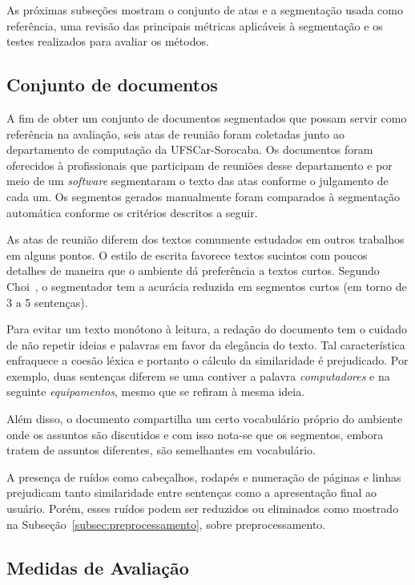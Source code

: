
As próximas subseções mostram o conjunto de atas e a segmentação usada como referência, uma revisão das principais métricas aplicáveis à segmentação e os testes realizados para avaliar os métodos.

\subsection{Conjunto de documentos}
	A fim de obter um conjunto de documentos segmentados que possam servir como referência na avaliação, seis atas de reunião foram coletadas junto ao departamento de computação da UFSCar-Sorocaba. Os documentos foram oferecidos à profissionais que participam de reuniões desse departamento e por meio de um \textit{software} segmentaram o texto das atas conforme o julgamento de cada um. Os segmentos gerados manualmente foram comparados à segmentação automática conforme os critérios descritos a seguir.
	
	As atas de reunião diferem dos textos comumente estudados em outros trabalhos em alguns pontos. O estilo de escrita favorece textos sucintos com poucos detalhes de maneira que o ambiente dá preferência a textos curtos. Segundo Choi~\cite{Choi2001-LSA}, o segmentador tem a acurácia reduzida em segmentos curtos (em torno de 3 a 5 sentenças).
	
	Para evitar um texto monótono à leitura, a redação do documento tem o cuidado de não repetir ideias e palavras em favor da elegância do texto. Tal característica enfraquece a coesão léxica e portanto o cálculo da similaridade é prejudicado. Por exemplo, duas sentenças diferem se uma contiver a palavra \textit{computadores} e na seguinte \textit{equipamentos}, mesmo que se refiram à mesma ideia.
	
	Além disso, o documento compartilha um certo vocabulário próprio do ambiente onde os assuntos são discutidos e com isso nota-se que os segmentos, embora tratem de assuntos diferentes, são semelhantes em vocabulário.
	
A presença de ruídos como cabeçalhos, rodapés e numeração de páginas e linhas prejudicam tanto similaridade entre sentenças como a apresentação final ao usuário. Porém, esses ruídos podem ser reduzidos ou eliminados como mostrado na Subseção~\ref{subsec:preprocessamento}, sobre preprocessamento.


\subsection{Medidas de Avaliação}


